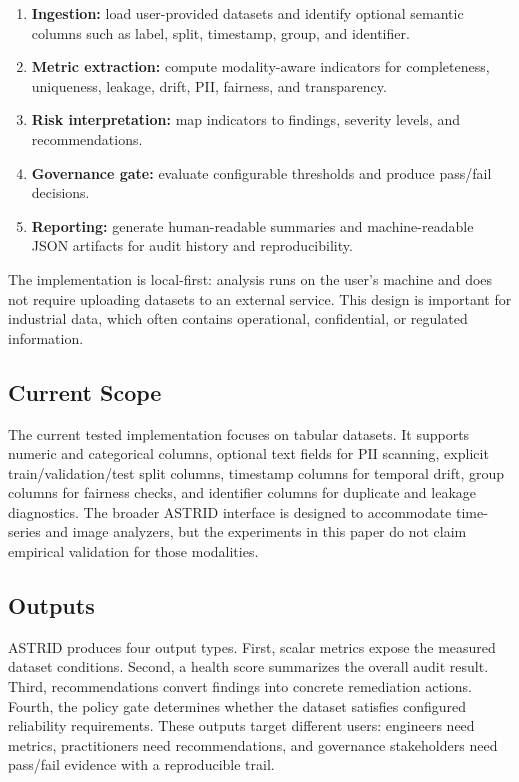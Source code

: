 \documentclass[runningheads]{llncs}
\begin{document}
\begin{enumerate}
    \item \textbf{Ingestion:} load user-provided datasets and identify optional
    semantic columns such as label, split, timestamp, group, and identifier.
    \item \textbf{Metric extraction:} compute modality-aware indicators for
    completeness, uniqueness, leakage, drift, PII, fairness, and transparency.
    \item \textbf{Risk interpretation:} map indicators to findings, severity
    levels, and recommendations.
    \item \textbf{Governance gate:} evaluate configurable thresholds and produce
    pass/fail decisions.
    \item \textbf{Reporting:} generate human-readable summaries and machine-readable
    JSON artifacts for audit history and reproducibility.
\end{enumerate}

The implementation is local-first: analysis runs on the user's machine and does
not require uploading datasets to an external service. This design is important
for industrial data, which often contains operational, confidential, or regulated
information.

\subsection{Current Scope}

The current tested implementation focuses on tabular datasets. It supports
numeric and categorical columns, optional text fields for PII scanning, explicit
train/validation/test split columns, timestamp columns for temporal drift, group
columns for fairness checks, and identifier columns for duplicate and leakage
diagnostics. The broader ASTRID interface is designed to accommodate time-series
and image analyzers, but the experiments in this paper do not claim empirical
validation for those modalities.

\subsection{Outputs}

ASTRID produces four output types. First, scalar metrics expose the measured
dataset conditions. Second, a health score summarizes the overall audit result.
Third, recommendations convert findings into concrete remediation actions. Fourth,
the policy gate determines whether the dataset satisfies configured reliability
requirements. These outputs target different users: engineers need metrics,
practitioners need recommendations, and governance stakeholders need pass/fail
evidence with a reproducible trail.
\end{document}
